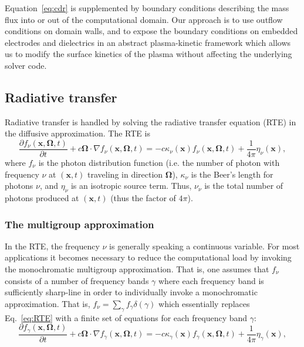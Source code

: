 \documentclass[3p]{elsarticle}
\def\bmx{\ensuremath{\bm{x}}}
\begin{document}
Equation~\eqref{eq:cdr} is supplemented by boundary conditions describing the mass flux into or out of the computational domain. Our approach is to use outflow conditions on domain walls, and to expose the boundary conditions on embedded electrodes and dielectrics in an abstract plasma-kinetic framework which allows us to modify the surface kinetics of the plasma without affecting the underlying solver code. 


\subsection{Radiative transfer}
\label{subsec:radiative_transfer}
Radiative transfer is handled by solving the radiative transfer equation (RTE) in the diffusive approximation. The RTE is
\begin{equation}
  \label{eq:RTE}
  \frac{\partial f_\nu\left(\bmx, \bm{\Omega}, t\right)}{\partial t} + c\bm{\Omega}\cdot\nabla f_\nu\left(\bmx, \bm{\Omega}, t\right) = -c\kappa_\nu(\bmx) f_\nu\left(\bmx, \bm{\Omega}, t\right) + \frac{1}{4\pi}\eta_\nu(\bmx),
\end{equation}
where $f_\nu$ is the photon distribution function (i.e. the number of photon with frequency $\nu$ at $(\bmx, t)$ traveling in direction $\bm{\Omega}$), $\kappa_\nu$ is the Beer's length for photons $\nu$, and $\eta_\nu$ is an isotropic source term. Thus, $\nu_\nu$ is the total number of photons produced at $(\bm{x},t)$ (thus the factor of $4\pi$).

\subsubsection{The multigroup approximation}
In the RTE, the frequency $\nu$ is generally speaking a continuous variable. For most applications it becomes necessary to reduce the computational load by invoking the monochromatic multigroup approximation. That is, one assumes that $f_\nu$ consists of a number of frequency bands $\gamma$ where each frequency band is sufficiently sharp-line in order to individually invoke a monochromatic approximation. That is, $f_\nu = \sum_\gamma f_\gamma\delta(\gamma)$ which essentially replaces Eq.~\eqref{eq:RTE} with a finite set of equations for each frequency band $\gamma$:
\begin{equation}
  \label{eq:multigroup}
  \frac{\partial f_\gamma\left(\bmx, \bm{\Omega}, t\right)}{\partial t} + c\bm{\Omega}\cdot\nabla f_\gamma\left(\bmx, \bm{\Omega}, t\right) = -c\kappa_\gamma(\bmx) f_\gamma\left(\bmx, \bm{\Omega}, t\right) + \frac{1}{4\pi}\eta_\gamma(\bmx),
\end{equation}
\end{document}
